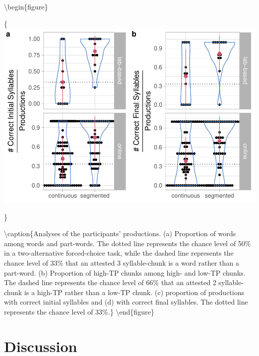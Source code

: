 \documentclass[
]{article}
\begin{document}
\textbackslash begin\{figure\}

\{\centering \includegraphics[width=0.8\linewidth]{segmentation_recall_combined_for_revision_files/figure-latex/recall-w-pw-chunks-positions-plot-positions-1}

\}

\textbackslash caption\{Analyses of the participants' productions. (a)
Proportion of words among words and part-words. The dotted line
represents the chance level of 50\% in a two-alternative forced-choice
task, while the dashed line represents the chance level of 33\% that an
attested 3 syllable-chunk is a word rather than a part-word. (b)
Proportion of high-TP chunks among high- and low-TP chunks. The dashed
line represents the chance level of 66\% that an attested 2
syllable-chunk is a high-TP rather than a low-TP chunk. (c) proportion
of productions with correct initial syllables and (d) with correct final
syllables. The dotted line represents the chance level of
33\%.\}\label{fig:recall-w-pw-chunks-positions-plot-positions}
\textbackslash end\{figure\}

\clearpage

\hypertarget{discussion}{%
\section{Discussion}\label{discussion}}
\end{document}
